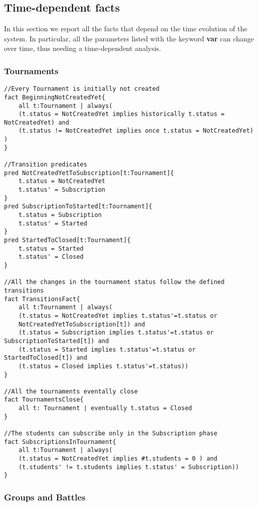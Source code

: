 \subsection{Time-dependent facts}
In this section we report all the facts that depend on the time evolution of the system. In particular, all the parameters listed with the keyword \textbf{var} can change over time, thus needing a time-dependent analysis.

\subsubsection{Tournaments}

\begin{verbatim}
//Every Tournament is initially not created
fact BeginningNotCreatedYet{
    all t:Tournament | always(
    (t.status = NotCreatedYet implies historically t.status = NotCreatedYet) and
    (t.status != NotCreatedYet implies once t.status = NotCreatedYet) )
}

//Transition predicates
pred NotCreatedYetToSubscription[t:Tournament]{
    t.status = NotCreatedYet
    t.status' = Subscription
}
pred SubscriptionToStarted[t:Tournament]{
    t.status = Subscription
    t.status' = Started
}
pred StartedToClosed[t:Tournament]{
    t.status = Started
    t.status' = Closed
}

//All the changes in the tournament status follow the defined transitions
fact TransitionsFact{
    all t:Tournament | always( 
    (t.status = NotCreatedYet implies t.status'=t.status or 
    NotCreatedYetToSubscription[t]) and
    (t.status = Subscription implies t.status'=t.status or SubscriptionToStarted[t]) and
    (t.status = Started implies t.status'=t.status or StartedToClosed[t]) and
    (t.status = Closed implies t.status'=t.status))
}

//All the tournaments eventally close
fact TournamentsClose{
    all t: Tournament | eventually t.status = Closed
}

//The students can subscribe only in the Subscription phase
fact SubscriptionsInTournament{
    all t:Tournament | always(
    (t.status = NotCreatedYet implies #t.students = 0 ) and
    (t.students' != t.students implies t.status' = Subscription))
}
\end{verbatim}

\subsubsection{Groups and Battles}

